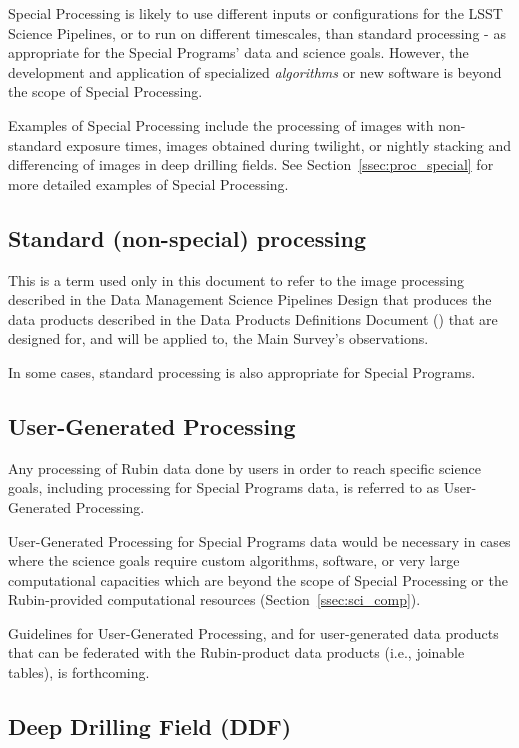 Special Processing is likely to use different inputs or configurations for the
LSST Science Pipelines, or to run on different timescales, than standard processing - 
as appropriate for the Special Programs' data and science goals.
However, the development and application of specialized \emph{algorithms} or new software
is beyond the scope of Special Processing.

Examples of Special Processing include the processing
of images with non-standard exposure times, images obtained
during twilight, or nightly stacking and differencing
of images in deep drilling fields.
See Section~\ref{ssec:proc_special} for more detailed examples of Special Processing.

\subsection{Standard (non-special) processing}\label{ssec:intro_stdproc}

This is a term used only in this document to refer to the image processing 
described in the Data Management Science Pipelines Design  that produces the data products described in the Data Products Definitions Document
() that are designed for, and will be applied to, the Main Survey's observations.

In some cases, standard processing is also appropriate for Special Programs.


\subsection{User-Generated Processing}

Any processing of Rubin data done by users in order to reach specific science goals, including
processing for Special Programs data, is referred to as User-Generated Processing.

User-Generated Processing for Special Programs data would be necessary in cases where
the science goals require custom algorithms, software, or very large computational
capacities which are beyond the scope of Special Processing or the Rubin-provided
computational resources (Section~\ref{ssec:sci_comp}).

Guidelines for User-Generated Processing, and for user-generated data products
that can be federated with the Rubin-product data products (i.e., joinable tables),
is forthcoming.

\subsection{Deep Drilling Field (DDF)}


